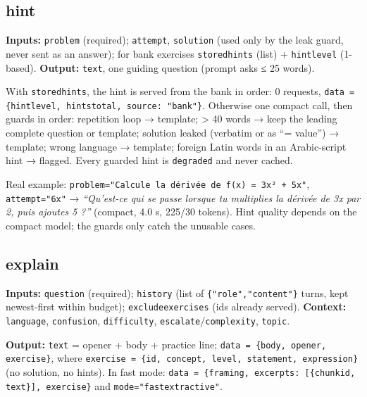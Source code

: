 \documentclass[11pt,a4paper]{article}
\renewcommand{\_}{\origus\allowbreak}
\begin{document}
\subsection{hint}

\textbf{Inputs:} \texttt{problem} (required); \texttt{attempt}, \texttt{solution} (used only by the leak guard, never
sent as an answer); for bank exercises \texttt{stored\_hints} (list) + \texttt{hint\_level} (1-based).
\textbf{Output:} \texttt{text}, one guiding question (prompt asks ≤ 25 words).

With \texttt{stored\_hints}, the hint is served from the bank in order: 0 requests,
\texttt{data = \{hint\_level, hints\_total, source: "bank"\}}. Otherwise one compact call, then guards in order:
repetition loop → template; > 40 words → keep the leading complete question or template; solution
leaked (verbatim or as ``= value'') → template; wrong language → template; foreign Latin words in an
Arabic-script hint → flagged. Every guarded hint is \texttt{degraded} and never cached.

Real example: \texttt{problem="Calcule la dérivée de f(x) = 3x² + 5x"}, \texttt{attempt="6x"} → \textit{``Qu'est-ce qui
se passe lorsque tu multiplies la dérivée de 3x par 2, puis ajoutes 5 ?''} (compact, 4.0 s, 225/30 tokens).
Hint quality depends on the compact model; the guards only catch the unusable cases.

\subsection{explain}
\label{sec:explain}

\textbf{Inputs:} \texttt{question} (required); \texttt{history} (list of \texttt{\{"role","content"\}} turns, kept
newest-first within budget); \texttt{exclude\_exercises} (ids already served).
\textbf{Context:} \texttt{language}, \texttt{confusion}, \texttt{difficulty}, \texttt{escalate}/\texttt{complexity}, \texttt{topic}.

\textbf{Output:} \texttt{text} = opener + body + practice line; \texttt{data = \{body, opener, exercise\}}, where
\texttt{exercise = \{id, concept, level, statement, expression\}} (no solution, no hints). In fast mode:
\texttt{data = \{framing, excerpts: [\{chunk\_id, text\}], exercise\}} and \texttt{mode="fast\_extractive"}.
\end{document}
